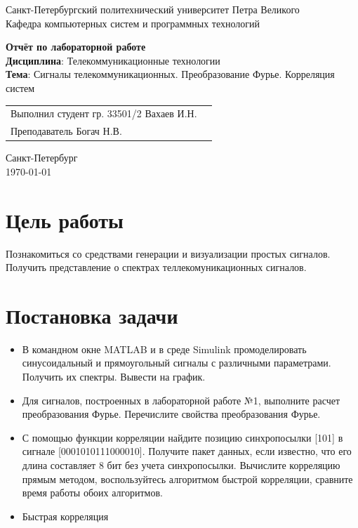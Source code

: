 \documentclass[a4paper,14pt]{extarticle}
\begin{document}
\begin{titlepage}
\centering
Санкт-Петербургский политехнический университет Петра Великого \\
\vspace{0.15cm}
Кафедра компьютерных систем и программных технологий \\
\vspace{6.5cm}

{\centering \textbf{Отчёт по лабораторной работе} \\ 
\vspace{0.15cm}
\textbf{Дисциплина}: Телекоммуникационные технологии \\
\vspace{0.15cm}
\textbf{Тема}: Сигналы телекоммуникационных. Преобразование Фурье. Корреляция
систем} \\

\vspace{6.5cm}

\begin{table}[H]
\begin{tabular}{p{\textwidth}@{}r}
{Выполнил студент гр. 33501/2} \hfill {Вахаев И.Н.} \\
{Преподаватель} \hfill {Богач Н.В.} \\
\end{tabular}
\end{table}
\vfill

{\centering Санкт-Петербург \\ 
\vspace{0.15cm}
\today}
\end{titlepage}

\tableofcontents
\newpage

\section{Цель работы}

Познакомиться со средствами генерации и визуализации простых сигналов.
Получить представление о спектрах теллекомуникационных сигналов.

\section{Постановка задачи}


\begin{itemize}
\item В командном окне MATLAB и в среде Simulink промоделировать синусоидальный и прямоугольный сигналы с различными параметрами. Получить их спектры. Вывести на график.
\item Для сигналов, построенных в лабораторной работе №1, выполните расчет преобразования Фурье. Перечислите свойства преобразования Фурье.
\item С помощью функции корреляции найдите позицию синхропосылки [101] в сигнале [0001010111000010]. Получите пакет
данных, если известно, что его длина составляет 8 бит без учета синхропосылки. Вычислите корреляцию прямым методом, воспользуйтесь алгоритмом быстрой корреляции, сравните время работы обоих алгоритмов.
\item Быстрая корреляция
\end{itemize}
\end{document}
